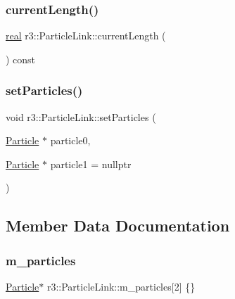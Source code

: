 \subsubsection{\texorpdfstring{current\+Length()}{currentLength()}}
{\footnotesize\ttfamily \mbox{\hyperlink{namespacer3_ab2016b3e3f743fb735afce242f0dc1eb}{real}} r3\+::\+Particle\+Link\+::current\+Length (\begin{DoxyParamCaption}{ }\end{DoxyParamCaption}) const\hspace{0.3cm}{\ttfamily [protected]}}

\mbox{\label{classr3_1_1_particle_link_ab3f21ea864e8e2709ef7672a9c417fa1}} 
\subsubsection{\texorpdfstring{set\+Particles()}{setParticles()}}
{\footnotesize\ttfamily void r3\+::\+Particle\+Link\+::set\+Particles (\begin{DoxyParamCaption}\item[{\mbox{\hyperlink{classr3_1_1_particle}{Particle}} $\ast$}]{particle0,  }\item[{\mbox{\hyperlink{classr3_1_1_particle}{Particle}} $\ast$}]{particle1 = {\ttfamily nullptr} }\end{DoxyParamCaption})}



\subsection{Member Data Documentation}
\mbox{\label{classr3_1_1_particle_link_a2794d7fe45d905d9c11bb79be3d8e3c8}} 
\subsubsection{\texorpdfstring{m\+\_\+particles}{m\_particles}}
{\footnotesize\ttfamily \mbox{\hyperlink{classr3_1_1_particle}{Particle}}$\ast$ r3\+::\+Particle\+Link\+::m\+\_\+particles\mbox{[}2\mbox{]} \{\}\hspace{0.3cm}{\ttfamily [protected]}}



